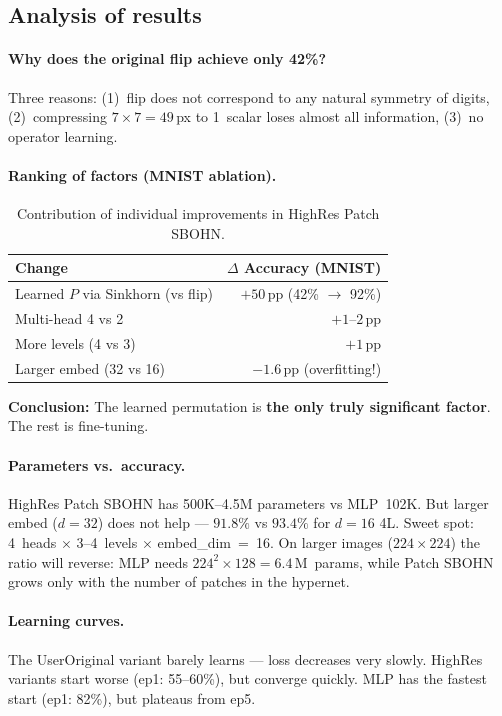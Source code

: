 \documentclass[11pt,a4paper]{report}
\begin{document}
\subsection{Analysis of results}

\paragraph{Why does the original flip achieve only 42\%?}
Three reasons: (1)~flip does not correspond to any natural symmetry of digits, (2)~compressing $7{\times}7 = 49$\,px to 1~scalar loses almost all information, (3)~no operator learning.

\paragraph{Ranking of factors (MNIST ablation).}

\begin{table}[h]
\centering
\caption{Contribution of individual improvements in HighRes Patch SBOHN.}
\begin{tabular}{lr}
\hline
\textbf{Change} & \textbf{$\Delta$ Accuracy (MNIST)} \\
\hline
Learned $P$ via Sinkhorn (vs flip) & $+50$\,pp (42\% $\to$ 92\%) \\
Multi-head 4 vs 2                   & $+1$--$2$\,pp \\
More levels (4 vs 3)              & $+1$\,pp \\
Larger embed (32 vs 16)            & $-1.6$\,pp (overfitting!) \\
\hline
\end{tabular}
\end{table}

\textbf{Conclusion:} The learned permutation is \textbf{the only truly significant factor}.
The rest is fine-tuning.

\paragraph{Parameters vs.\ accuracy.}
HighRes Patch SBOHN has 500K--4.5M parameters vs MLP~102K. But larger embed ($d{=}32$)
does not help --- $91.8\%$ vs $93.4\%$ for $d{=}16$ 4L. Sweet spot: 4~heads $\times$ 3--4~levels
$\times$ embed\_dim~=~16. On larger images ($224{\times}224$) the ratio will reverse: MLP
needs $224^2 \times 128 = 6.4$\,M~params, while Patch SBOHN grows only with the number of patches
in the hypernet.

\paragraph{Learning curves.}
The UserOriginal variant barely learns --- loss decreases very slowly. HighRes variants
start worse (ep1: 55--60\%), but converge quickly. MLP has the fastest start (ep1: 82\%),
but plateaus from ep5.
\end{document}
